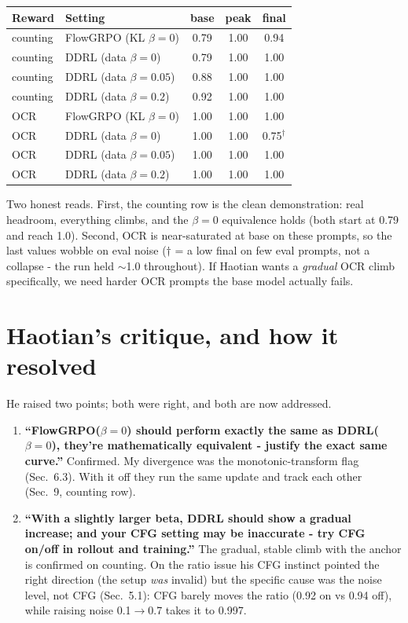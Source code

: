 \documentclass[11pt]{article}
\begin{document}
\begin{center}
\small
\begin{tabular}{@{}llccc@{}}
\toprule
\textbf{Reward} & \textbf{Setting} & \textbf{base} & \textbf{peak} & \textbf{final} \\
\midrule
counting & FlowGRPO (KL $\beta{=}0$)     & 0.79 & 1.00 & 0.94 \\
counting & DDRL (data $\beta{=}0$)        & 0.79 & 1.00 & 1.00 \\
counting & DDRL (data $\beta{=}0.05$)     & 0.88 & 1.00 & 1.00 \\
counting & DDRL (data $\beta{=}0.2$)      & 0.92 & 1.00 & 1.00 \\
\midrule
OCR      & FlowGRPO (KL $\beta{=}0$)      & 1.00 & 1.00 & 1.00 \\
OCR      & DDRL (data $\beta{=}0$)        & 1.00 & 1.00 & 0.75$^\dagger$ \\
OCR      & DDRL (data $\beta{=}0.05$)     & 1.00 & 1.00 & 1.00 \\
OCR      & DDRL (data $\beta{=}0.2$)      & 1.00 & 1.00 & 1.00 \\
\bottomrule
\end{tabular}
\end{center}

\noindent Two honest reads. First, the counting row is the clean demonstration: real
headroom, everything climbs, and the $\beta{=}0$ equivalence holds (both start at 0.79
and reach 1.0). Second, OCR is near-saturated at base on these prompts, so the last
values wobble on eval noise ($\dagger$ = a low final on few eval prompts, not a
collapse - the run held $\sim$1.0 throughout). If Haotian wants a \textit{gradual} OCR
climb specifically, we need harder OCR prompts the base model actually fails.

\section{Haotian's critique, and how it resolved}

He raised two points; both were right, and both are now addressed.
\begin{enumerate}
\item \textbf{``FlowGRPO($\beta{=}0$) should perform exactly the same as DDRL($\beta{=}0$),
they're mathematically equivalent - justify the exact same curve.''} Confirmed. My
divergence was the monotonic-transform flag (Sec.~6.3). With it off they run the same
update and track each other (Sec.~9, counting row).
\item \textbf{``With a slightly larger beta, DDRL should show a gradual increase; and
your CFG setting may be inaccurate - try CFG on/off in rollout and training.''} The
gradual, stable climb with the anchor is confirmed on counting. On the ratio issue his
CFG instinct pointed the right direction (the setup \textit{was} invalid) but the
specific cause was the noise level, not CFG (Sec.~5.1): CFG barely moves the ratio
(0.92 on vs 0.94 off), while raising noise 0.1$\to$0.7 takes it to 0.997.
\end{enumerate}
\end{document}
